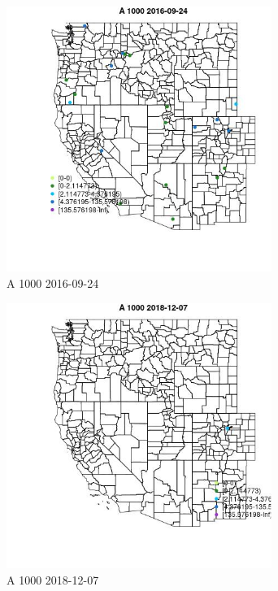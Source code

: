\begin{figure} 
\centering  
\includegraphics[width=0.77\textwidth]{Code_Outputs/Report_ML_input_PM25_Step4_part_e_de_duplicated_aves_MapObsA_10002016-09-24.jpg} 
\caption{\label{fig:Report_ML_input_PM25_Step4_part_e_de_duplicated_avesMapObsA_10002016-09-24}A 1000 2016-09-24} 
\end{figure} 
 

\begin{figure} 
\centering  
\includegraphics[width=0.77\textwidth]{Code_Outputs/Report_ML_input_PM25_Step4_part_e_de_duplicated_aves_MapObsA_10002018-12-07.jpg} 
\caption{\label{fig:Report_ML_input_PM25_Step4_part_e_de_duplicated_avesMapObsA_10002018-12-07}A 1000 2018-12-07} 
\end{figure} 
 

